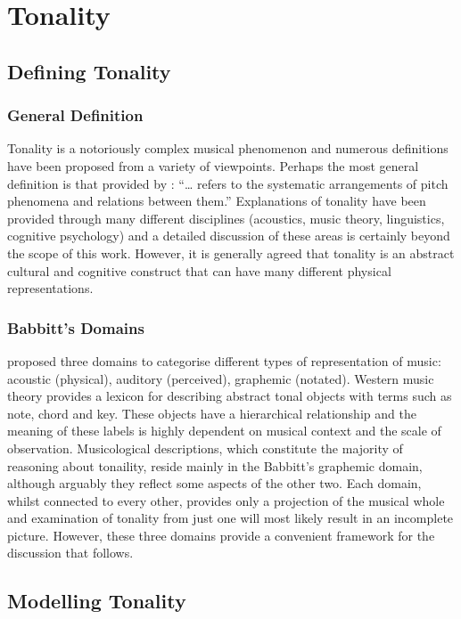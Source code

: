 \documentclass{article}
\begin{document}
\section{Tonality}
\label{sec-2}
\subsection{Defining Tonality}
\label{sec-2-1}
\subsubsection{General Definition}
\label{sec-2-1-1}

Tonality is a notoriously complex musical phenomenon and numerous
definitions have been proposed from a variety of viewpoints. Perhaps
the most general definition is that provided by \citet{Hyer2013}:
``\ldots{} refers to the systematic arrangements of pitch phenomena and
relations between them.'' Explanations of tonality have been provided
through many different disciplines (acoustics, music theory,
linguistics, cognitive psychology) and a detailed discussion of these
areas is certainly beyond the scope of this work. However, it is
generally agreed that tonality is an abstract cultural and cognitive
construct that can have many different physical representations.
\subsubsection{Babbitt's Domains}
\label{sec-2-1-2}

\citet{Babbitt1965} proposed three domains to categorise different
types of representation of music: acoustic (physical), auditory
(perceived), graphemic (notated). Western music theory provides a
lexicon for describing abstract tonal objects with terms such as note,
chord and key. These objects have a hierarchical relationship and the
meaning of these labels is highly dependent on musical context and the
scale of observation. Musicological descriptions, which constitute the
majority of reasoning about tonaility, reside mainly in the Babbitt's
graphemic domain, although arguably they reflect some aspects of the
other two. Each domain, whilst connected to every other, provides only
a projection of the musical whole and examination of tonality from
just one will most likely result in an incomplete picture. However,
these three domains provide a convenient framework for the discussion
that follows.
\subsection{Modelling Tonality}
\label{sec-2-2}
\end{document}
